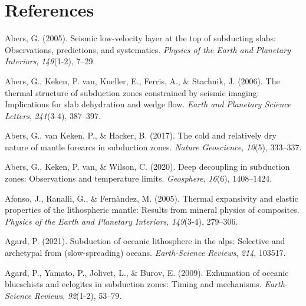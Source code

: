 \cleardoublepage

\hypertarget{references}{%
\chapter*{References}\label{references}}


\hypertarget{refs_main}{}
\begin{CSLReferences}{1}{1}
\leavevmode{}%
Abers, G. (2005). Seismic low-velocity layer at the top of subducting slabs: Observations, predictions, and systematics. \emph{Physics of the Earth and Planetary Interiors}, \emph{149}(1-2), 7--29.

\leavevmode{}%
Abers, G., Keken, P. van, Kneller, E., Ferris, A., \& Stachnik, J. (2006). The thermal structure of subduction zones constrained by seismic imaging: Implications for slab dehydration and wedge flow. \emph{Earth and Planetary Science Letters}, \emph{241}(3-4), 387--397.

\leavevmode{}%
Abers, G., van Keken, P., \& Hacker, B. (2017). The cold and relatively dry nature of mantle forearcs in subduction zones. \emph{Nature Geoscience}, \emph{10}(5), 333--337.

\leavevmode{}%
Abers, G., Keken, P. van, \& Wilson, C. (2020). Deep decoupling in subduction zones: Observations and temperature limits. \emph{Geosphere}, \emph{16}(6), 1408--1424.

\leavevmode{}%
Afonso, J., Ranalli, G., \& Fernàndez, M. (2005). Thermal expansivity and elastic properties of the lithospheric mantle: Results from mineral physics of composites. \emph{Physics of the Earth and Planetary Interiors}, \emph{149}(3-4), 279--306.

\leavevmode{}%
Agard, P. (2021). Subduction of oceanic lithosphere in the alps: Selective and archetypal from (slow-spreading) oceans. \emph{Earth-Science Reviews}, \emph{214}, 103517.

\leavevmode{}%
Agard, P., Yamato, P., Jolivet, L., \& Burov, E. (2009). Exhumation of oceanic blueschists and eclogites in subduction zones: Timing and mechanisms. \emph{Earth-Science Reviews}, \emph{92}(1-2), 53--79.


\end{CSLReferences}
